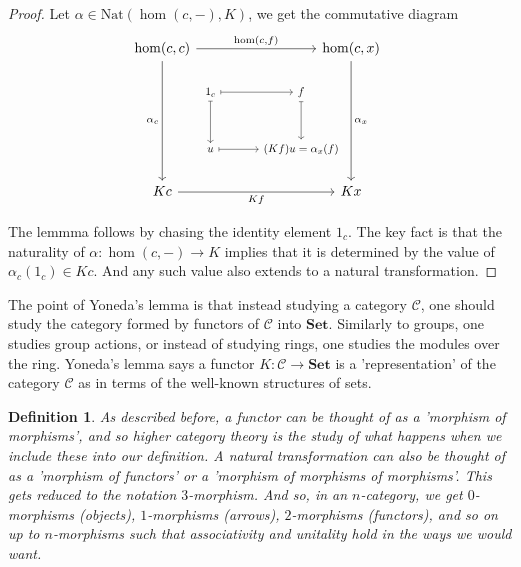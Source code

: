 \documentclass[12pt,a4paper]{article}
\newtheorem{definition}[theorem]{Definition}
\newcommand\CC{\mathcal{C}}
\begin{document}
\begin{proof}
    Let $\alpha\in\text{Nat}(\hom(c,-),K)$, we get the commutative diagram
\[ 
\stackinset{l}{12ex}{b}{8ex}{%
\scalebox{.8}
{%
\begin{tikzcd}[row sep=8ex, column sep = 8ex, ampersand replacement=\&]
1_c
    \arrow[mapsto]{r}
    \arrow[mapsto]{d}
\& f 
    \arrow[mapsto]{d}  \\
u 
    \arrow[mapsto]{r} 
\& (Kf)u=\alpha_x(f)
\end{tikzcd}
} 
}{%
\begin{tikzcd}[row sep = 20ex, column sep = 20ex, ampersand replacement=\&]
\hom(c,c) 
    \arrow{r}{\hom(c,f)} 
    \arrow[swap]{d}{\alpha_c}
\& \hom(c,x) 
    \arrow{d}{\alpha_x}  \\
Kc
    \arrow[swap]{r}{Kf} 
\& Kx
\end{tikzcd}
}
\]

The lemmma follows by chasing the identity element $1_c$.
The key fact is that the naturality of $\alpha:\hom(c,-)\to K$ implies that it is determined by the value of $\alpha_c(1_c)\in Kc$.
And any such value also extends to a natural transformation.
\end{proof}

The point of Yoneda's lemma is that instead studying a category $\CC$, one should study the category formed by functors of $\CC$ into $\textbf{Set}$.
Similarly to groups, one studies group actions, or instead of studying rings, one studies the modules over the ring.
Yoneda's lemma says a functor $K:\CC\to\textbf{Set}$ is a 'representation' of the category $\CC$ as in terms of the well-known structures of sets.

\begin{definition}
    As described before, a functor can be thought of as a 'morphism of morphisms', and so higher category theory is the study of what happens when we include these into our definition.
    A natural transformation can also be thought of as a 'morphism of functors' or a 'morphism of morphisms of morphisms'. 
    This gets reduced to the notation $3$-morphism.
    And so, in an $n$-category, we get $0$-morphisms (objects), $1$-morphisms (arrows), $2$-morphisms (functors), and so on up to $n$-morphisms such that associativity and unitality hold in the ways we would want.
\end{definition}
\end{document}
